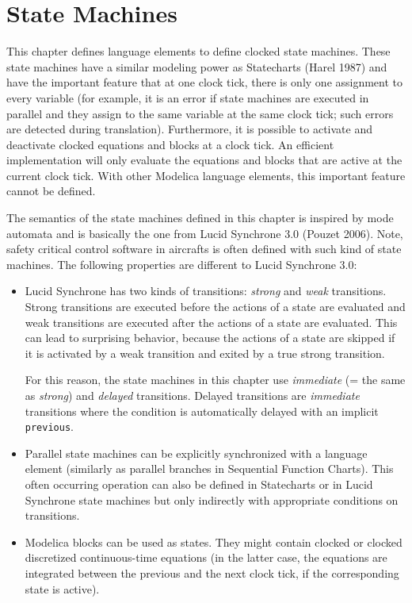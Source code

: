 \chapter{State Machines}\label{state-machines}

\begin{nonnormative}
This chapter defines language elements to define clocked state
machines. These state machines have a similar modeling power as
Statecharts (Harel 1987) and have the important feature that at one
clock tick, there is only one assignment to every variable (for example,
it is an error if state machines are executed in parallel and they
assign to the same variable at the same clock tick; such errors are
detected during translation). Furthermore, it is possible to activate
and deactivate clocked equations and blocks at a clock tick. An
efficient implementation will only evaluate the equations and blocks
that are active at the current clock tick. With other Modelica language
elements, this important feature cannot be defined.

The semantics of the state machines defined in this chapter is
inspired by mode automata and is basically the one from Lucid Synchrone
3.0 (Pouzet 2006). Note, safety critical control software in aircrafts
is often defined with such kind of state machines. The following
properties are different to Lucid Synchrone 3.0:
\begin{itemize}
\item
  Lucid Synchrone has two kinds of transitions: \emph{strong} and
  \emph{weak} transitions. Strong transitions are executed before the
  actions of a state are evaluated and weak transitions are executed
  after the actions of a state are evaluated. This can lead to
  surprising behavior, because the actions of a state are skipped if it
  is activated by a weak transition and exited by a true strong
  transition.

  For this reason, the state machines in this chapter use \emph{immediate}
  (= the same as \emph{strong}) and \emph{delayed} transitions. Delayed
  transitions are \emph{immediate} transitions where the condition is
  automatically delayed with an implicit \lstinline!previous!.
\item
  Parallel state machines can be explicitly synchronized with a
  language element (similarly as parallel branches in Sequential
  Function Charts). This often occurring operation can also be defined
  in Statecharts or in Lucid Synchrone state machines but only
  indirectly with appropriate conditions on transitions.
\item
  Modelica blocks can be used as states. They might contain
  clocked or clocked discretized continuous-time equations (in the
  latter case, the equations are integrated between the previous and the
  next clock tick, if the corresponding state is active).
\end{itemize}
\end{nonnormative}

